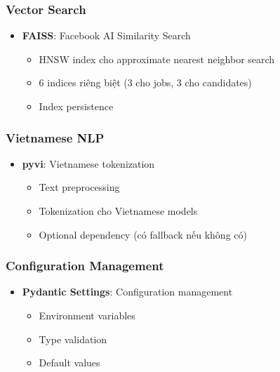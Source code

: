 \subsubsection{Vector Search}

\begin{itemize}
    \item \textbf{FAISS}: Facebook AI Similarity Search
    \begin{itemize}
        \item HNSW index cho approximate nearest neighbor search
        \item 6 indices riêng biệt (3 cho jobs, 3 cho candidates)
        \item Index persistence
    \end{itemize}
\end{itemize}

\subsubsection{Vietnamese NLP}

\begin{itemize}
    \item \textbf{pyvi}: Vietnamese tokenization
    \begin{itemize}
        \item Text preprocessing
        \item Tokenization cho Vietnamese models
        \item Optional dependency (có fallback nếu không có)
    \end{itemize}
\end{itemize}

\subsubsection{Configuration Management}

\begin{itemize}
    \item \textbf{Pydantic Settings}: Configuration management
    \begin{itemize}
        \item Environment variables
        \item Type validation
        \item Default values
    \end{itemize}
\end{itemize}


